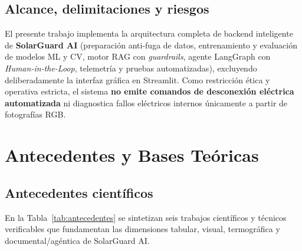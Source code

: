 \documentclass[12pt,a4paper]{article}
\begin{document}
\subsection{Alcance, delimitaciones y riesgos}
El presente trabajo implementa la arquitectura completa de backend inteligente de \textbf{SolarGuard AI} (preparación anti-fuga de datos, entrenamiento y evaluación de modelos ML y CV, motor RAG con \textit{guardrails}, agente LangGraph con \textit{Human-in-the-Loop}, telemetría y pruebas automatizadas), excluyendo deliberadamente la interfaz gráfica en Streamlit. Como restricción ética y operativa estricta, el sistema \textbf{no emite comandos de desconexión eléctrica automatizada} ni diagnostica fallos eléctricos internos únicamente a partir de fotografías RGB.

\section{Antecedentes y Bases Teóricas}

\subsection{Antecedentes científicos}
En la Tabla~\ref{tab:antecedentes} se sintetizan seis trabajos científicos y técnicos verificables que fundamentan las dimensiones tabular, visual, termográfica y documental/agéntica de SolarGuard AI.
\end{document}
